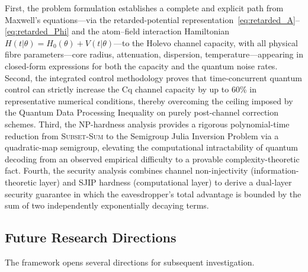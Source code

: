 \documentclass[journal,twocolumn]{IEEEtran}
\theoremstyle{definition}
\theoremstyle{plain}
\begin{document}
First, the problem formulation establishes a complete and explicit
path from Maxwell's equations---via the retarded-potential
representation~\eqref{eq:retarded_A}--\eqref{eq:retarded_Phi} and
the atom--field interaction Hamiltonian $H(t|\theta) = H_0(\theta)
+ V(t|\theta)$---to the Holevo channel capacity, with all physical
fibre parameters---core radius, attenuation, dispersion,
temperature---appearing in closed-form expressions for both the
capacity and the quantum noise rates.  Second, the integrated
control methodology proves that time-concurrent quantum control can
strictly increase the Cq channel capacity by up to 60\% in
representative numerical conditions, thereby overcoming the ceiling
imposed by the Quantum Data Processing Inequality on purely
post-channel correction schemes.  Third, the NP-hardness analysis
provides a rigorous polynomial-time reduction from
\textsc{Subset-Sum} to the Semigroup Julia Inversion Problem via a
quadratic-map semigroup, elevating the computational intractability
of quantum decoding from an observed empirical difficulty to a
provable complexity-theoretic fact.  Fourth, the security analysis
combines channel non-injectivity (information-theoretic layer) and
SJIP hardness (computational layer) to derive a dual-layer security
guarantee in which the eavesdropper's total advantage is bounded by
the sum of two independently exponentially decaying terms.

\subsection{Future Research Directions}

The framework opens several directions for subsequent investigation.
\end{document}
